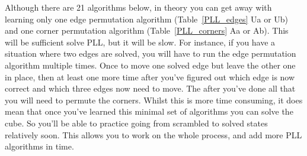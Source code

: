 \documentclass[paper=a4, fontsize=11pt, parskip=full]{scrartcl} %
\newcommand{\2}{\ensuremath{^2}} %
\begin{document}
Although there are 21 algorithms below, in theory you can get away with learning only one edge 
permutation algorithm (Table~\ref{PLL_edges} Ua or Ub) and one corner permutation 
algorithm (Table~\ref{PLL_corners} Aa or Ab). This will be sufficient solve PLL, but it will be 
slow. For instance, if you have a situation where two edges are solved, you will have to run the 
edge permutation algorithm multiple times. Once to move one solved edge but leave the 
other one in place, then at least one more time after you've figured out which edge is now 
correct and which three edges now need to move. The after you've done all that you will need to 
permute the corners. Whilst this is more time consuming, it does mean that once you've learned 
this minimal set of algorithms you can solve the cube. So you'll be able to practice going 
from scrambled to solved states relatively soon. This allows you to work on the whole process, 
and add more PLL algorithms in time. 
\end{document}
